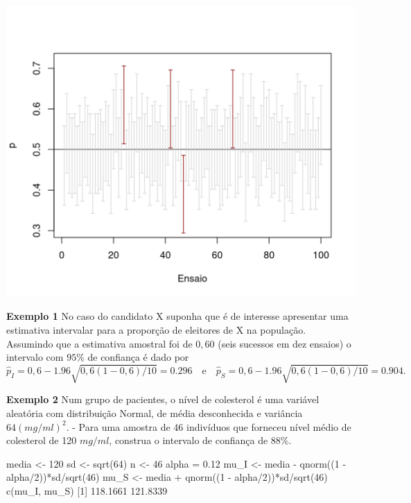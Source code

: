 \documentclass[
  10pt,
  a4paper]{book}
\newenvironment{Shaded}{\begin{snugshade}}{\end{snugshade}}
\newcommand{\DecValTok}[1]{\textcolor[rgb]{0.00,0.00,0.81}{#1}}
\newcommand{\FloatTok}[1]{\textcolor[rgb]{0.00,0.00,0.81}{#1}}
\newcommand{\FunctionTok}[1]{\textcolor[rgb]{0.00,0.00,0.00}{#1}}
\newcommand{\NormalTok}[1]{#1}
\newcommand{\OtherTok}[1]{\textcolor[rgb]{0.56,0.35,0.01}{#1}}
\newcommand{\SpecialCharTok}[1]{\textcolor[rgb]{0.00,0.00,0.00}{#1}}
\begin{document}
\begin{center}\includegraphics{figures/unnamed-chunk-384-1} \end{center}

\textbf{Exemplo 1} No caso do candidato X suponha que é de interesse apresentar uma estimativa intervalar para a proporção de eleitores de X na população. Assumindo que a estimativa amostral foi de \(0,60\) (seis sucessos em dez ensaios) o intervalo com \(95\%\) de confiança é dado por
\[
\hat{p}_I = 0,6 - 1.96\sqrt{0,6(1-0,6)/10} = 0.296 \quad \text{e} \quad \hat{p}_S = 0,6 - 1.96\sqrt{0,6(1-0,6)/10} = 0.904.
\]

\textbf{Exemplo 2} Num grupo de pacientes, o nível de colesterol é uma variável aleatória com distribuição Normal, de média desconhecida e variância \(64 (mg/ml)^2\).
- Para uma amostra de 46 indivíduos que forneceu nível médio de colesterol de 120 \(mg/ml\), construa o intervalo de confiança de \(88\%\).

\begin{Shaded}
\begin{Highlighting}[]
\NormalTok{media }\OtherTok{\textless{}{-}} \DecValTok{120}
\NormalTok{sd }\OtherTok{\textless{}{-}} \FunctionTok{sqrt}\NormalTok{(}\DecValTok{64}\NormalTok{)}
\NormalTok{n }\OtherTok{\textless{}{-}} \DecValTok{46}
\NormalTok{alpha }\OtherTok{=} \FloatTok{0.12}
\NormalTok{mu\_I }\OtherTok{\textless{}{-}}\NormalTok{ media }\SpecialCharTok{{-}} \FunctionTok{qnorm}\NormalTok{((}\DecValTok{1} \SpecialCharTok{{-}}\NormalTok{ alpha}\SpecialCharTok{/}\DecValTok{2}\NormalTok{))}\SpecialCharTok{*}\NormalTok{sd}\SpecialCharTok{/}\FunctionTok{sqrt}\NormalTok{(}\DecValTok{46}\NormalTok{)}
\NormalTok{mu\_S }\OtherTok{\textless{}{-}}\NormalTok{ media }\SpecialCharTok{+} \FunctionTok{qnorm}\NormalTok{((}\DecValTok{1} \SpecialCharTok{{-}}\NormalTok{ alpha}\SpecialCharTok{/}\DecValTok{2}\NormalTok{))}\SpecialCharTok{*}\NormalTok{sd}\SpecialCharTok{/}\FunctionTok{sqrt}\NormalTok{(}\DecValTok{46}\NormalTok{)}
\FunctionTok{c}\NormalTok{(mu\_I, mu\_S)}
\NormalTok{[}\DecValTok{1}\NormalTok{] }\FloatTok{118.1661} \FloatTok{121.8339}
\end{Highlighting}
\end{Shaded}
\end{document}
